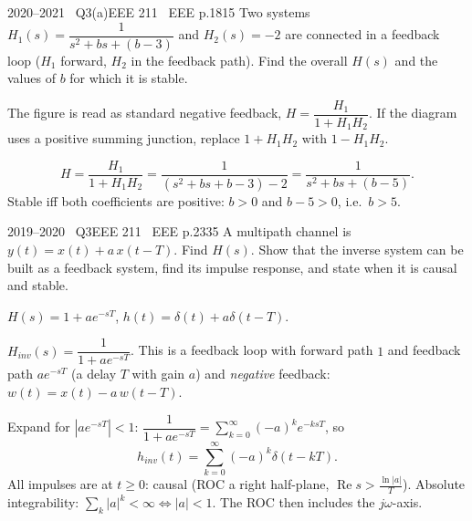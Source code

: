 \begin{qcard}{2020--2021 \textbullet\ Q3(a)}{EEE 211 \textbullet\ EEE p.18}{15}
Two systems $H_1(s)=\dfrac1{s^2+bs+(b-3)}$ and $H_2(s)=-2$ are connected in a feedback loop ($H_1$ forward, $H_2$ in the feedback path). Find the overall $H(s)$ and the values of $b$ for which it is stable.
\end{qcard}
\begin{notebox}The figure is read as standard negative feedback, $H=\dfrac{H_1}{1+H_1H_2}$. If the diagram uses a positive summing junction, replace $1+H_1H_2$ with $1-H_1H_2$.\end{notebox}
\begin{solution}
\[H=\frac{H_1}{1+H_1H_2}=\frac{1}{(s^2+bs+b-3)-2}=\frac{1}{s^2+bs+(b-5)}.\]
Stable iff both coefficients are positive: $b>0$ and $b-5>0$, i.e.\ $b>5$.
\end{solution}

\begin{qcard}{2019--2020 \textbullet\ Q3}{EEE 211 \textbullet\ EEE p.23}{35}
A multipath channel is $y(t)=x(t)+a\,x(t-T)$. Find $H(s)$. Show that the inverse system can be built as a feedback system, find its impulse response, and state when it is causal and stable.
\end{qcard}
\begin{solution}
 $H(s)=1+ae^{-sT}$, $h(t)=\delta(t)+a\delta(t-T)$.

 $H_{inv}(s)=\dfrac1{1+ae^{-sT}}$. This is a feedback loop with forward path $1$ and feedback path $ae^{-sT}$ (a delay $T$ with gain $a$) and \emph{negative} feedback: $w(t)=x(t)-a\,w(t-T)$.

 Expand for $|ae^{-sT}|<1$: $\dfrac1{1+ae^{-sT}}=\sum_{k=0}^\infty(-a)^ke^{-ksT}$, so
\[h_{inv}(t)=\sum_{k=0}^{\infty}(-a)^k\delta(t-kT).\]
 All impulses are at $t\ge0$: causal (ROC a right half-plane, $\operatorname{Re}s>\frac{\ln|a|}{T}$). Absolute integrability: $\sum_k|a|^k<\infty\iff|a|<1$. The ROC then includes the $j\omega$-axis.
\end{solution}

